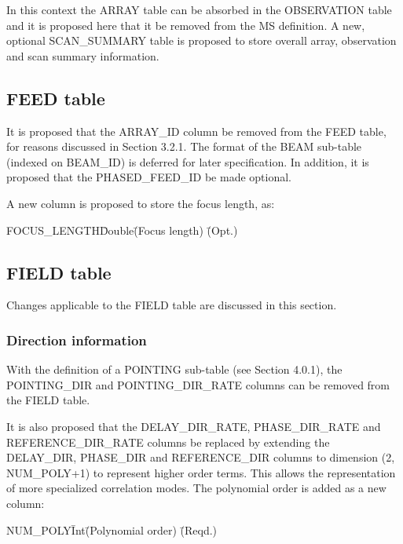 \documentclass{article}
\begin{document}
In this context the ARRAY table can be absorbed in the OBSERVATION
table and it is proposed here that it be removed from the MS
definition.  A new, optional SCAN\_SUMMARY table is proposed to store
overall array, observation and scan summary information.

\subsection{FEED table}

It is proposed that the ARRAY\_ID column be removed from the FEED
table, for reasons discussed in Section 3.2.1.  The format of the BEAM
sub-table (indexed on BEAM\_ID) is deferred for later specification.
In addition, it is proposed that the PHASED\_FEED\_ID be made optional.

A new column is proposed to store the focus length, as:

\begin{tabbing}
FOCUS\_LENGTH\quad\quad \= Double\quad\quad \= 
(Focus length) \quad\quad \= (Opt.) \\ 
\end{tabbing}


\subsection{FIELD table}

Changes applicable to the FIELD table are discussed in this section.

\subsubsection{Direction information}

With the definition of a POINTING sub-table (see Section 4.0.1), the
POINTING\_DIR and POINTING\_DIR\_RATE columns can be removed from the
FIELD table. 

It is also proposed that the DELAY\_DIR\_RATE, PHASE\_DIR\_RATE and
REFERENCE\_DIR\_RATE columns be replaced by extending the DELAY\_DIR,
PHASE\_DIR and REFERENCE\_DIR columns to dimension (2, NUM\_POLY+1) to
represent higher order terms. This allows the representation of more
specialized correlation modes. The polynomial order is added as a new
column:

\begin{tabbing}
NUM\_POLY\quad\quad \= Int\quad\quad \= (Polynomial order)
 \quad\quad \= (Reqd.) \\
\end{tabbing}
\end{document}
